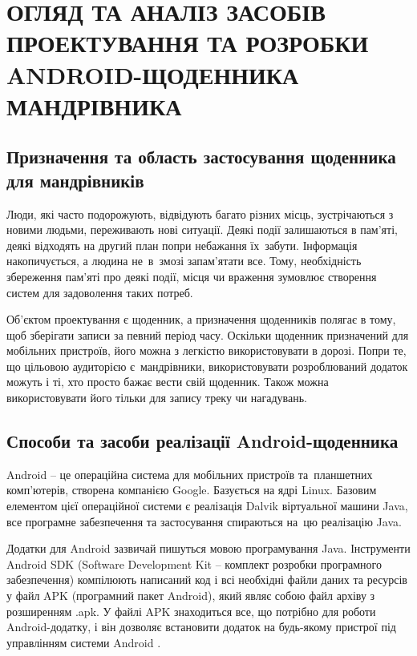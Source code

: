 \documentclass[../main.tex]{subfiles}
\begin{document}
\chapter{ОГЛЯД ТА АНАЛІЗ ЗАСОБІВ ПРОЕКТУВАННЯ ТА РОЗРОБКИ ANDROID-ЩОДЕННИКА МАНДРІВНИКА}

\section{Призначення та область застосування щоденника для мандрівників}

Люди, які часто подорожують, відвідують багато різних місць, зустрічаються з новими людьми, переживають нові ситуації. Деякі події залишаються в пам'яті, деякі відходять на другий план попри небажання їх~забути. Інформація накопичується, а людина не~в~змозі запам'ятати все. Тому, необхідність збереження пам'яті про деякі події, місця чи враження зумовлює створення систем для задоволення таких потреб.

Об'єктом проектування є щоденник, а призначення щоденників полягає в тому, щоб зберігати записи за певний період часу. Оскільки щоденник призначений для мобільних пристроїв, його можна з легкістю використовувати в дорозі. Попри те, що цільовою аудиторією є~мандрівники, використовувати розроблюваний додаток можуть і ті, хто просто бажає вести свій щоденник. Також можна використовувати його тільки для запису треку чи нагадувань.

\section{Способи та засоби реалізації Android-щоденника}

Android -- це операційна система для мобільних пристроїв та~планшетних комп'ютерів, створена компанією Google. Базується на ядрі Linux. Базовим елементом цієї операційної системи є реалізація Dalvik віртуальної машини Java, все програмне забезпечення та застосування спираються на~цю реалізацію Java.

Додатки для Android зазвичай пишуться мовою програмування Java. Інструменти Android SDK (Software Development Kit -- комплект розробки програмного забезпечення) компілюють написаний код і всі необхідні файли даних та ресурсів у файл APK (програмний пакет Android), який являє собою файл архіву з розширенням .apk. У файлі APK знаходиться все, що потрібно для роботи Android-додатку, і він дозволяє встановити додаток на будь-якому пристрої під управлінням системи Android \cite{android_for_devs}. 
\end{document}
